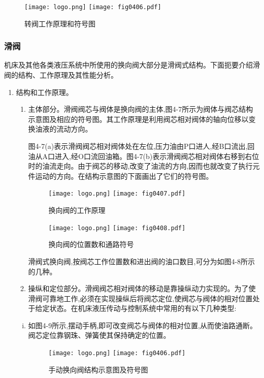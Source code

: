 \begin{figure}[htbp]\centering
\ifOpenSource
\texttt{[image: logo.png]}
\else
\texttt{[image: fig0406.pdf]}
\fi
\caption{转阀工作原理和符号图}
\label{fig:fig0406}
\end{figure}

\subsubsection{滑阀}

机床及其他各类液压系统中所使用的换向阀大部分是滑阀式结构。下面扼要介绍滑阀的结构、工作原理及其性能分析。

\begin{enumerate}[(1)]
\item 结构和工作原理。

\begin{enumerate}[1)]
\item 主体部分。滑阀阀芯与阀体是换向阀的主体,图4-7所示为阀体与阀芯结构示意图及相应的符号图。其工作原理是利用阀芯相对阀体的轴向位移以变换油液的流动方向。

图4-7(a)表示滑阀阀芯相对阀体处在左位,压力油由P口进人,经B口流出,回油从A口进入,经O口流回油箱。图4-7(b)表示滑阀阀芯相对阀体右移到右位时的油流走向。由于阀芯的移动,改变了油流的方向,因而也就改变了执行元件运动的方向。在结构示意图的下面画出了它们的符号图。

\begin{figure}[htbp]\centering
\ifOpenSource
\texttt{[image: logo.png]}
\else
\texttt{[image: fig0407.pdf]}
\fi
\caption{换向阀的工作原理}
\label{fig:fig0407}
\end{figure}

\begin{figure}[htbp]\centering
\ifOpenSource
\texttt{[image: logo.png]}
\else
\texttt{[image: fig0408.pdf]}
\fi
\caption{换向阀的位置数和通路符号}
\label{fig:fig0408}
\end{figure}

滑阀式换向阀,按阀芯工作位置数和进出阀的油口数目,可分为如图4-8所示的几种。

\item 操纵和定位部分。滑阀阀芯相对阀体的移动是靠操纵动力实现的。为了使滑阀可靠地工作,必须在实现操纵后将阀芯定位,使阀芯与阀体的相对位置处于给定状态。在机床液压传动与控制系统中常用的有以下几种类型:
\end{enumerate}

\begin{enumerate}[(i)]
\item 如图4-9所示,摆动手柄,即可改变阀芯与阀体的相对位置,从而使油路通断。阀芯定位靠钢珠、弹簧使其保持确定的位置。

\begin{figure}[htbp]\centering
\ifOpenSource
\texttt{[image: logo.png]}
\else
\texttt{[image: fig0406.pdf]}
\fi
\caption{手动换向阀结构示意图及符号图}
\label{fig:fig0406}
\end{figure}

\end{enumerate}
\end{enumerate}


